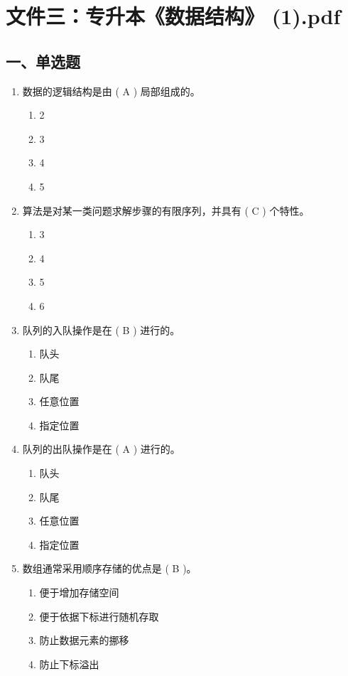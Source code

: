 \documentclass[12pt, a4paper]{article}
\begin{document}
\section{文件三：专升本《数据结构》 (1).pdf}

\subsection*{一、单选题}

\begin{enumerate}[label=\arabic*.]
    \item 数据的逻辑结构是由 ( A ) 局部组成的。
    \begin{enumerate}
        \item 2
        \item 3
        \item 4
        \item 5
    \end{enumerate}

    \item 算法是对某一类问题求解步骤的有限序列，并具有 ( C ) 个特性。
    \begin{enumerate}
        \item 3
        \item 4
        \item 5
        \item 6
    \end{enumerate}

    \item 队列的入队操作是在 ( B ) 进行的。
    \begin{enumerate}
        \item 队头
        \item 队尾
        \item 任意位置
        \item 指定位置
    \end{enumerate}

    \item 队列的出队操作是在 ( A ) 进行的。
    \begin{enumerate}
        \item 队头
        \item 队尾
        \item 任意位置
        \item 指定位置
    \end{enumerate}

    \item 数组通常采用顺序存储的优点是 ( B )。
    \begin{enumerate}
        \item 便于增加存储空间
        \item 便于依据下标进行随机存取
        \item 防止数据元素的挪移
        \item 防止下标溢出
    \end{enumerate}


\end{enumerate}
\end{document}
